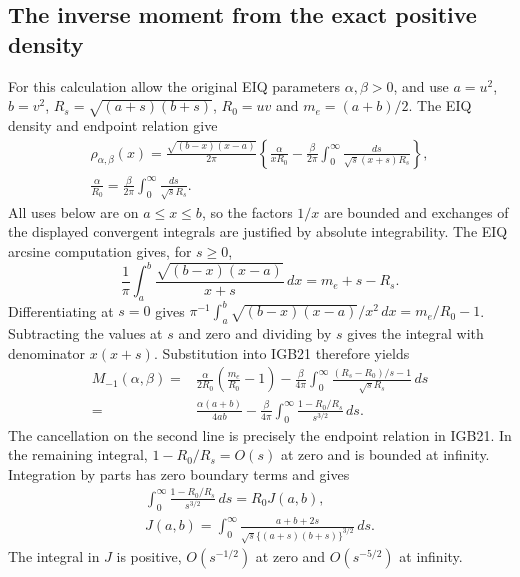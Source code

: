 \subsection{The inverse moment from the exact positive density}

For this calculation allow the original EIQ parameters
$\alpha,\beta>0$, and use $a=u^2$, $b=v^2$,
$R_s=\sqrt{(a+s)(b+s)}$, $R_0=uv$ and $m_e=(a+b)/2$.
The EIQ density and endpoint relation give
\[
 \begin{gathered}
 \rho_{\alpha,\beta}(x)=
 \frac{\sqrt{(b-x)(x-a)}}{2\pi}
 \left\{\frac{\alpha}{xR_0}
  -\frac{\beta}{2\pi}
       \int_0^\infty\frac{ds}{\sqrt{s}(x+s)R_s}\right\},\\
 \frac{\alpha}{R_0}
   =\frac{\beta}{2\pi}\int_0^\infty\frac{ds}{\sqrt{s}R_s}.
 \end{gathered}\tag{IGB21}
\]
All uses below are on $a\leq x\leq b$, so the factors $1/x$
are bounded and exchanges of the displayed convergent
integrals are justified by absolute integrability.
The EIQ arcsine computation gives, for $s\geq0$,
\[
 \frac1\pi\int_a^b\frac{\sqrt{(b-x)(x-a)}}{x+s}\,dx
      =m_e+s-R_s .
 \tag{IGB22}
\]
Differentiating at $s=0$ gives
$\pi^{-1}\int_a^b\sqrt{(b-x)(x-a)}/x^2\,dx
=m_e/R_0-1$. Subtracting the values at $s$ and zero and
dividing by $s$ gives the integral with denominator $x(x+s)$.
Substitution into IGB21 therefore yields
\[
 \begin{aligned}
 M_{-1}(\alpha,\beta)
 ={}&\frac{\alpha}{2R_0}
                  \left(\frac{m_e}{R_0}-1\right)
 -\frac{\beta}{4\pi}
   \int_0^\infty
    \frac{(R_s-R_0)/s-1}{\sqrt{s}R_s}\,ds\\
 ={}&\frac{\alpha(a+b)}{4ab}
 -\frac{\beta}{4\pi}\int_0^\infty
                    \frac{1-R_0/R_s}{s^{3/2}}\,ds .
 \end{aligned}\tag{IGB23}
\]
The cancellation on the second line is precisely the endpoint
relation in IGB21. In the remaining integral,
$1-R_0/R_s=O(s)$ at zero and is bounded at infinity.
Integration by parts has zero boundary terms and gives
\[
 \begin{gathered}
 \int_0^\infty\frac{1-R_0/R_s}{s^{3/2}}\,ds
 =R_0J(a,b),\\
 J(a,b)=\int_0^\infty
 \frac{a+b+2s}{\sqrt{s}\{(a+s)(b+s)\}^{3/2}}\,ds .
 \end{gathered}\tag{IGB24}
\]
The integral in $J$ is positive, $O(s^{-1/2})$ at zero
and $O(s^{-5/2})$ at infinity.

